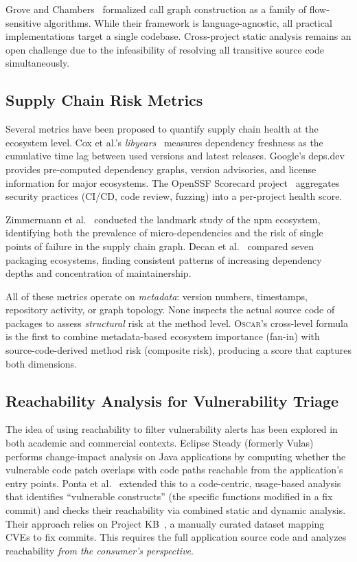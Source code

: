\documentclass[conference]{IEEEtran}
\begin{document}
Grove and Chambers~\cite{grove2001framework} formalized call graph construction as a family of flow-sensitive algorithms. While their framework is language-agnostic, all practical implementations target a single codebase. Cross-project static analysis remains an open challenge due to the infeasibility of resolving all transitive source code simultaneously.

\subsection{Supply Chain Risk Metrics}

Several metrics have been proposed to quantify supply chain health at the ecosystem level. Cox et al.'s \emph{libyears}~\cite{cox2015measuring} measures dependency freshness as the cumulative time lag between used versions and latest releases. Google's deps.dev~\cite{depsdev} provides pre-computed dependency graphs, version advisories, and license information for major ecosystems. The OpenSSF Scorecard project~\cite{openssf} aggregates security practices (CI/CD, code review, fuzzing) into a per-project health score.

Zimmermann et al.~\cite{zimmermann2019small} conducted the landmark study of the npm ecosystem, identifying both the prevalence of micro-dependencies and the risk of single points of failure in the supply chain graph. Decan et al.~\cite{decan2019empirical} compared seven packaging ecosystems, finding consistent patterns of increasing dependency depths and concentration of maintainership.

All of these metrics operate on \emph{metadata}: version numbers, timestamps, repository activity, or graph topology. None inspects the actual source code of packages to assess \emph{structural} risk at the method level. \textsc{Oscar}'s cross-level formula is the first to combine metadata-based ecosystem importance (fan-in) with source-code-derived method risk (composite risk), producing a score that captures both dimensions.

\subsection{Reachability Analysis for Vulnerability Triage}

The idea of using reachability to filter vulnerability alerts has been explored in both academic and commercial contexts. Eclipse Steady (formerly Vulas)~\cite{plate2015eclipsesteady} performs change-impact analysis on Java applications by computing whether the vulnerable code patch overlaps with code paths reachable from the application's entry points. Ponta et al.~\cite{ponta2018beyond} extended this to a code-centric, usage-based analysis that identifies ``vulnerable constructs'' (the specific functions modified in a fix commit) and checks their reachability via combined static and dynamic analysis. Their approach relies on Project KB~\cite{ponta2019projectkb}, a manually curated dataset mapping CVEs to fix commits. This requires the full application source code and analyzes reachability \emph{from the consumer's perspective}.
\end{document}

